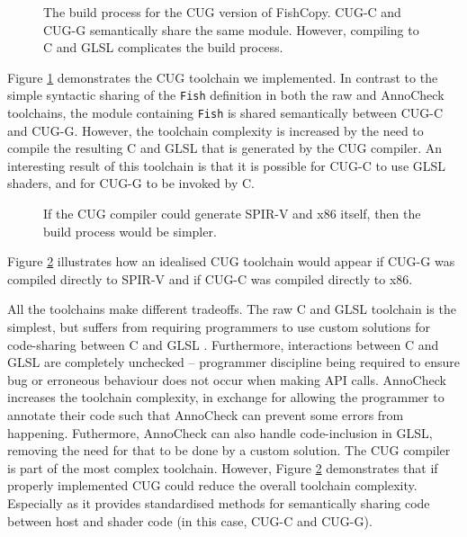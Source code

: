 \documentclass[a4paper,12pt,twoside,openright]{report}
\begin{document}
\begin{figure}[h]
\centering
\def\svgwidth{0.8\linewidth}

\caption{The build process for the CUG version of FishCopy. CUG-C and CUG-G
semantically share the same module. However, compiling to C and GLSL
complicates the build process.}
\label{fig:pipeline_cug}
\end{figure}

Figure \ref{fig:pipeline_cug} demonstrates the CUG toolchain we implemented. In
contrast to the simple syntactic sharing of the \texttt{Fish} definition in
both the raw and AnnoCheck toolchains, the module containing \texttt{Fish} is
shared semantically between CUG-C and CUG-G. However, the toolchain complexity
is increased by the need to compile the resulting C and GLSL that is generated
by the CUG compiler. An interesting result of this toolchain is that it is
possible for CUG-C to use GLSL shaders, and for CUG-G to be invoked by C.

\begin{figure}[h]
\centering
\def\svgwidth{0.8\linewidth}

\caption{If the CUG compiler could generate SPIR-V and x86 itself, then the build
process would be simpler.}
\label{fig:pipeline_cug_future}
\end{figure}

Figure \ref{fig:pipeline_cug_future} illustrates how an idealised CUG toolchain
would appear if CUG-G was compiled directly to SPIR-V and if CUG-C was compiled
directly to x86.

All the toolchains make different tradeoffs. The raw C and GLSL toolchain is
the simplest, but suffers from requiring programmers to use custom solutions
for code-sharing between C and GLSL \cite{NoIncludeGLSL}. Furthermore,
interactions between C and GLSL are completely unchecked -- programmer
discipline being required to ensure bug or erroneous behaviour does not occur
when making API calls. AnnoCheck increases the toolchain complexity, in
exchange for allowing the programmer to annotate their code such that AnnoCheck
can prevent some errors from happening. Futhermore, AnnoCheck can also handle
code-inclusion in GLSL, removing the need for that to be done by a custom
solution. The CUG compiler is part of the most complex toolchain. However,
Figure \ref{fig:pipeline_cug_future} demonstrates that if properly implemented
CUG could reduce the overall toolchain complexity. Especially as it provides
standardised methods for semantically sharing code between host and shader code
(in this case, CUG-C and CUG-G).
\end{document}
